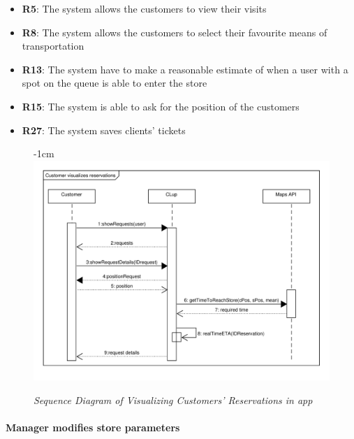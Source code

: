 \documentclass{article}
\begin{document}
\begin{center}
					\newpage
					
					\begin{itemize}
					\bigskip
					\bigskip
					\bigskip
					 {\bfseries Required functional requirements: }


					\item {\bfseries R5}: The system allows the customers to view their visits
					\item {\bfseries R8}: The system allows the customers to select their favourite means of transportation
					\item {\bfseries R13}: The system have to make a reasonable estimate of when a user with a spot on the queue is able to enter the store
					\item {\bfseries R15}: The system is able to ask for the position of the customers
					\item {\bfseries R27}: The system saves clients' tickets

					
					\end{itemize}
				\end{center}
					\begin{figure}
						\begin{adjustwidth} {-1cm}{}
							\centering
							\includegraphics[scale=0.65]{SD/6_visualizeReservation.pdf}\\
							\caption{\emph{Sequence Diagram of Visualizing Customers' Reservations in app}}
						\end{adjustwidth}
					\end{figure}
			\newpage
			\paragraph{Manager modifies store parameters}
			
\end{document}
